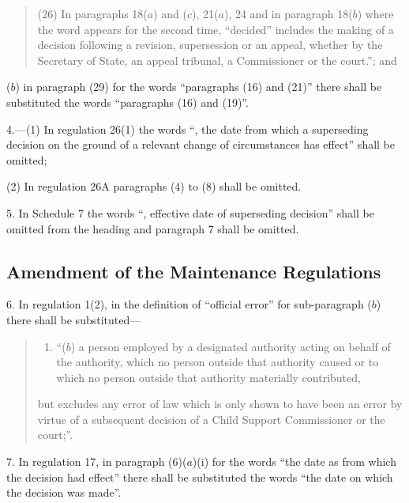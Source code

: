 \documentclass[12pt,a4paper]{article}
\begin{document}
\begin{enumerate}
\begin{quotation}
(26) In paragraphs 18($a$)  and ($c$), 21($a$), 24 and in paragraph 18($b$)  where the word appears for the second time, “decided” includes the making of a decision following a revision, supersession or an appeal, whether by the Secretary of State, an appeal tribunal, a Commissioner or the court.”; and
\end{quotation}

($b$) in paragraph (29) for the words “paragraphs (16) and (21)” there shall be substituted the words “paragraphs (16) and (19)”.
\end{enumerate}

\medskip

4.---(1)  In regulation 26(1) the words “, the date from which a superseding decision on the ground of a relevant change of circumstances has effect” shall be omitted;

(2) In regulation 26A paragraphs (4) to (8) shall be omitted.

\medskip

5.  In Schedule 7 the words “, \lowercase{EFFECTIVE DATE OF SUPERSEDING DECISION}” shall be omitted from the heading and paragraph 7 shall be omitted.

\subsection[6--9. Amendment of the Maintenance Regulations]{Amendment of the Maintenance Regulations}

6.  In regulation 1(2), in the definition of “official error” for sub-paragraph ($b$)  there shall be substituted—
\begin{quotation}
\begin{enumerate}\item[]
“($b$) a person employed by a designated authority acting on behalf of the authority, which no person outside that authority caused or to which no person outside that authority materially contributed,
\end{enumerate}\noindent
but excludes any error of law which is only shown to have been an error by virtue of a subsequent decision of a Child Support Commissioner or the court;”.
\end{quotation}

\medskip

7.  In regulation 17, in paragraph (6)($a$)(i)  for the words “the date as from which the decision had effect” there shall be substituted the words “the date on which the decision was made”.
\end{document}
